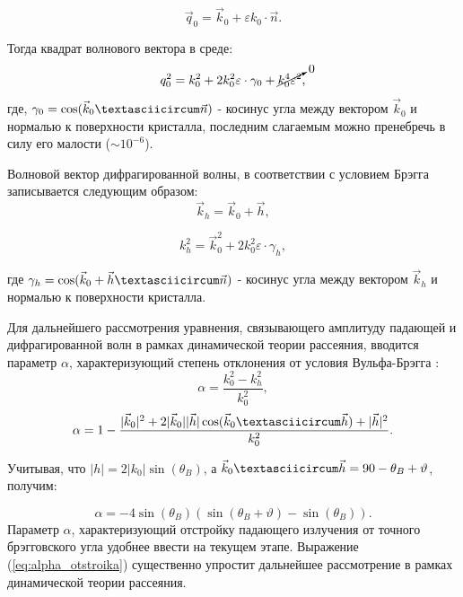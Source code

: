  \begin{equation}
   \vec{q}_0 = \vec{k}_0 + \varepsilon k_0 \cdot \vec{n}.
  \end{equation}

Тогда квадрат волнового вектора в среде:
\begin{equation}
   q_0^2 = k_0^2 + 2k_0^2 \varepsilon \cdot \gamma_0 + \cancelto{0}{k_0^4  \varepsilon^2},
   \label{eq:k_0_squred}
 \end{equation}
\noindent
где, $\gamma_0 = \cos(\vec{k}_0 \textasciicircum \vec{n})$ - косинус угла между вектором $\vec{k}_0$ и нормалью к поверхности кристалла,
последним слагаемым можно пренебречь в силу его малости ($\sim 10^{-6}$).

  Волновой вектор дифрагированной волны, в соответствии с условием Брэгга записывается следующим образом:
  $$\vec{k}_h = \vec{k}_0+\vec{h},$$

  \begin{equation}
     k_h^2 = \vec{k}_0^2+2k_0^2 \varepsilon \cdot \gamma_h,
     \label{eq:k_h_squred}
   \end{equation}
\noindent

где $\gamma_h = \cos(\vec{k}_0+ \vec{h} \textasciicircum \vec{n})$ - косинус угла между вектором $\vec{k}_h$ и нормалью к поверхности кристалла.

Для дальнейшего рассмотрения уравнения, связывающего амплитуду падающей и дифрагированной волн в рамках
динамической теории рассеяния, вводится параметр $\alpha$,
характеризующий степень отклонения от условия Вульфа-Брэгга \cite{Bushuev_Oreshko_2002}:
\begin{equation}
   \alpha = \frac{k_0^2-k_h^2}{k_0^2},
   \label{eq:alpha}
\end{equation}
$$  \alpha = 1 - \frac{|\vec{k}_0|^2+2|\vec{k}_0||\vec{h}|\cos(\vec{k}_0 \textasciicircum \vec{h})+|\vec{h}|^2}{k_0^2}.$$

Учитывая, что $ |h| = 2|k_0| \sin(\theta_B) $, а $\vec{k}_0 \textasciicircum \vec{h} = 90-\theta_B+\vartheta$, получим:

\begin{equation}
   \alpha = -4\sin(\theta_B)(\sin(\theta_B+\vartheta)-\sin(\theta_B)).
   \label{eq:alpha_otstroika}
\end{equation}
\noindent
Параметр $\alpha$, характеризующий отстройку падающего излучения от точного брэгговского угла удобнее ввести на
текущем этапе. Выражение (\ref{eq:alpha_otstroika}) существенно упростит
 дальнейшее рассмотрение в рамках динамической теории рассеяния.
